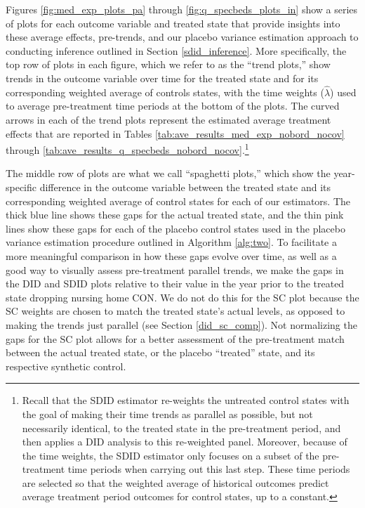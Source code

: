 \documentclass[../Main.tex]{subfiles}
\begin{document}
\indent Figures \ref{fig:med_exp_plots_pa} through \ref{fig:q_specbeds_plots_in} show a series of plots for each outcome variable and treated state that provide insights into these average effects, pre-trends, and our placebo variance estimation approach to conducting inference outlined in Section \ref{sdid_inference}. More specifically, the top row of plots in each figure, which we refer to as the ``trend plots,'' show trends in the outcome variable over time for the treated state and for its corresponding weighted average of controls states, with the time weights ($\hat{\lambda}$) used to average pre-treatment time periods at the bottom of the plots. The curved arrows in each of the trend plots represent the estimated average treatment effects that are reported in Tables \ref{tab:ave_results_med_exp_nobord_nocov} through \ref{tab:ave_results_q_specbeds_nobord_nocov}.\footnote{Recall that the SDID estimator re-weights the untreated control states with the goal of making their time trends as parallel as possible, but not necessarily identical, to the treated state in the pre-treatment period, and then applies a DID analysis to this re-weighted panel. Moreover, because of the time weights, the SDID estimator only focuses on a subset of the pre-treatment time periods when carrying out this last step. These time periods are selected so that the weighted average of historical outcomes predict average treatment period outcomes for control states, up to a constant.} 

The middle row of plots are what we call ``spaghetti plots,'' which show the year-specific difference in the outcome variable between the treated state and its corresponding weighted average of control states for each of our estimators. The thick blue line shows these gaps for the actual treated state, and the thin pink lines show these gaps for each of the placebo control states used in the placebo variance estimation procedure outlined in Algorithm \ref{alg:two}. To facilitate a more meaningful comparison in how these gaps evolve over time, as well as a good way to visually assess pre-treatment parallel trends, we make the gaps in the DID and SDID plots relative to their value in the year prior to the treated state dropping nursing home CON. We do not do this for the SC plot because the SC weights are chosen to match the treated state's actual levels, as opposed to making the trends just parallel (see Section \ref{did_sc_comp}). Not normalizing the gaps for the SC plot allows for a better assessment of the pre-treatment match between the actual treated state, or the placebo ``treated'' state, and its respective synthetic control. 
\end{document}
